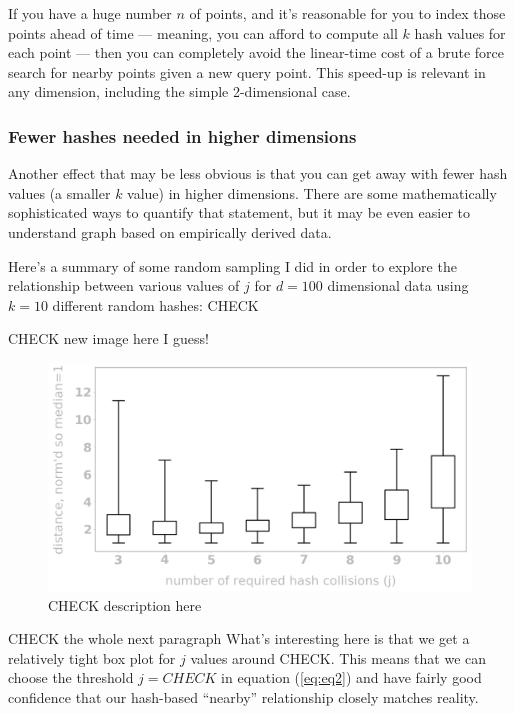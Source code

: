 \documentclass[20pt,]{extarticle}
\begin{document}
If you have a huge number \(n\) of points, and it's reasonable for you
to index those points ahead of time --- meaning, you can afford to
compute all \(k\) hash values for each point --- then you can completely
avoid the linear-time cost of a brute force search for nearby points
given a new query point. This speed-up is relevant in any dimension,
including the simple 2-dimensional case.

\subsubsection{Fewer hashes needed in higher
dimensions}\label{fewer-hashes-needed-in-higher-dimensions}

Another effect that may be less obvious is that you can get away with
fewer hash values (a smaller \(k\) value) in higher dimensions. There
are some mathematically sophisticated ways to quantify that statement,
but it may be even easier to understand graph based on empirically
derived data.

Here's a summary of some random sampling I did in order to explore the
relationship between various values of \(j\) for \(d=100\) dimensional
data using \(k=10\) different random hashes: CHECK

CHECK new image here I guess!

\begin{figure}
\centering
\includegraphics{images/image9@2x.png}
\caption{CHECK description here}\label{fig:fig10}
\end{figure}

CHECK the whole next paragraph What's interesting here is that we get a
relatively tight box plot for \(j\) values around CHECK. This means that
we can choose the threshold \(j=CHECK\) in equation (\ref{eq:eq2}) and
have fairly good confidence that our hash-based ``nearby'' relationship
closely matches reality.
\end{document}
